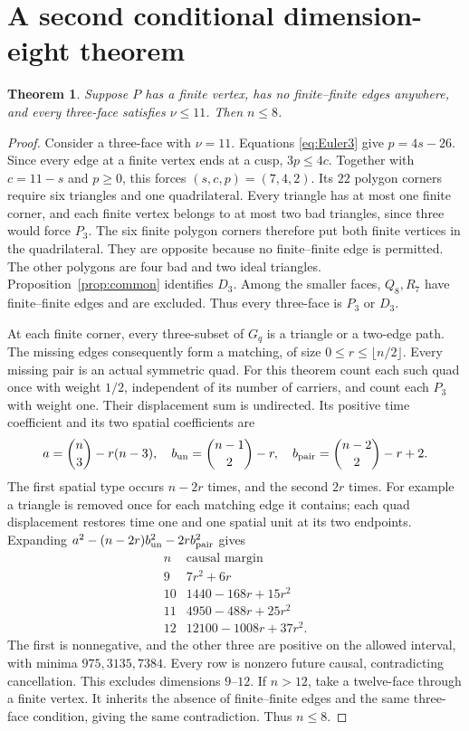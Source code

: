 \documentclass[11pt]{article}
\newtheorem{theorem}{Theorem}[section]
\theoremstyle{definition}\newtheorem{definition}[theorem]{Definition}
\theoremstyle{remark}\newtheorem{remark}[theorem]{Remark}
\newcommand{\nuu}{\nu}
\newcommand{\Pthree}{P_3}
\newcommand{\Dthree}{D_3}
\newcommand{\Qeight}{Q_8}
\newcommand{\Rseven}{R_7}
\newcommand{\bin}[2]{\binom{#1}{#2}}
\begin{document}
\section{A second conditional dimension-eight theorem}
\begin{theorem}\label{thm:ideal_edges8}
Suppose \(P\) has a finite vertex, has no finite--finite edges
anywhere, and every three-face satisfies \(\nuu\le11\). Then
\(n\le8\).
\end{theorem}
\begin{proof}
Consider a three-face with \(\nuu=11\). Equations
\eqref{eq:Euler3} give \(p=4s-26\). Since every edge at a
finite vertex ends at a cusp, \(3p\le4c\). Together with
\(c=11-s\) and \(p\ge0\), this forces
\((s,c,p)=(7,4,2)\). Its \(22\) polygon corners require six
triangles and one quadrilateral. Every triangle has at most one finite
corner, and each finite vertex belongs to at most two bad triangles,
since three would force \(\Pthree\). The six finite polygon
corners therefore put both finite vertices in the quadrilateral.
They are opposite because no finite--finite edge is permitted.
The other polygons are four bad and two ideal triangles.
Proposition~\ref{prop:common} identifies \(\Dthree\).
Among the smaller faces, \(\Qeight,\Rseven\) have
finite--finite edges and are excluded. Thus every three-face is
\(\Pthree\) or \(\Dthree\).

At each finite corner, every three-subset of \(G_q\) is a triangle
or a two-edge path. The missing edges consequently form a matching,
of size \(0\le r\le\lfloor n/2\rfloor\). Every missing pair
is an actual symmetric quad. For this theorem count each such quad
once with weight \(1/2\), independent of its number of carriers,
and count each \(\Pthree\) with weight one.
Their displacement sum is undirected. Its positive time coefficient
and its two spatial coefficients are
\[
 a=\bin n3-r(n-3),\quad
 b_{\rm un}=\bin{n-1}{2}-r,\quad
 b_{\rm pair}=\bin{n-2}{2}-r+2.
\]
The first spatial type occurs \(n-2r\) times, and the second \(2r\)
times. For example a triangle is removed once for each matching edge
it contains; each quad displacement restores time one and one spatial
unit at its two endpoints. Expanding
\(a^2-(n-2r)b_{\rm un}^2-2rb_{\rm pair}^2\) gives
\[
\begin{array}{c|l}
 n&\text{causal margin}\\ \hline
 9&7r^2+6r\\
 10&1440-168r+15r^2\\
 11&4950-488r+25r^2\\
 12&12100-1008r+37r^2 .
\end{array}
\]
The first is nonnegative, and the other three are positive on the
allowed interval, with minima \(975,3135,7384\).
Every row is nonzero future causal, contradicting cancellation.
This excludes dimensions \(9\)--\(12\). If \(n>12\), take a
twelve-face through a finite vertex. It inherits the absence of
finite--finite edges and the same three-face condition, giving the
same contradiction. Thus \(n\le8\).
\end{proof}
\end{document}
